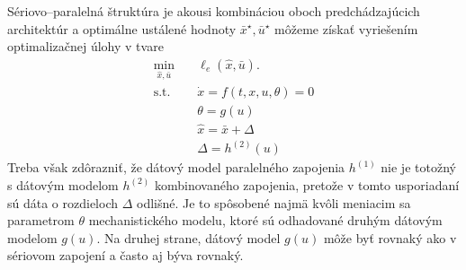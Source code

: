 Sériovo--paralelná štruktúra je akousi kombináciou oboch predchádzajúcich architektúr a optimálne ustálené hodnoty $ \bar{x}^{\star}, \bar{u}^{\star} $ môžeme získať vyriešením  optimalizačnej úlohy v tvare
\begin{equation}
	\begin{split}
		\min_{\hat{x},\bar{u}} &\quad \ell_e\left(\hat{x},\bar{u}\right).\\
		\text{s.t.} &\quad \dot{x} = f\left(t,x,u,\theta\right) = 0\\
		&\quad \theta = g(u) \\
		&\quad \hat{x} = \bar{x} + \Delta \\
		&\quad \Delta = h^{(2)}(u)
	\end{split}
\end{equation}
Treba však zdôrazniť, že dátový model paralelného zapojenia $ h^{(1)} $ nie je totožný s dátovým modelom $ h^{(2)} $ kombinovaného zapojenia, pretože v tomto usporiadaní sú dáta o rozdieloch $ \Delta $ odlišné. Je to spôsobené najmä kvôli meniacim sa parametrom $ \theta $ mechanistického modelu, ktoré sú odhadované druhým dátovým modelom $ g(u) $. Na druhej strane, dátový model $ g(u) $ môže byť rovnaký ako v sériovom zapojení a často aj býva rovnaký. 
